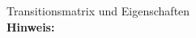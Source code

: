 \begin{question}[section=2,name={Transitionsmatrix},difficulty=3,type=mdl,tags={}]
	Transitionsmatrix und Eigenschaften
	\\ \textbf{Hinweis:}\\
	
\end{question}
\begin{solution}
	
\end{solution}
